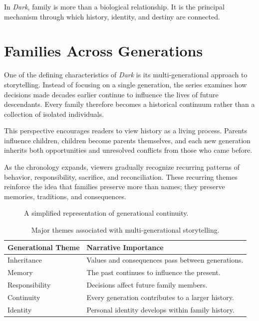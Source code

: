 \documentclass[12pt,oneside,openany]{book}
\begin{document}
\begin{tcolorbox}[colback=gray!8,colframe=black,title=Key Observation]
In \textit{Dark}, family is more than a biological relationship. It is the
principal mechanism through which history, identity, and destiny are connected.
\end{tcolorbox}
\section{Families Across Generations}

One of the defining characteristics of \textit{Dark} is its multi-generational
approach to storytelling. Instead of focusing on a single generation, the
series examines how decisions made decades earlier continue to influence the
lives of future descendants. Every family therefore becomes a historical
continuum rather than a collection of isolated individuals.

This perspective encourages readers to view history as a living process.
Parents influence children, children become parents themselves, and each new
generation inherits both opportunities and unresolved conflicts from those who
came before.

As the chronology expands, viewers gradually recognize recurring patterns of
behavior, responsibility, sacrifice, and reconciliation. These recurring
themes reinforce the idea that families preserve more than names; they preserve
memories, traditions, and consequences.

\begin{figure}[H]
\centering
{}
\caption{A simplified representation of generational continuity.}
\end{figure}

\begin{table}[H]
\centering
\begin{tabular}{|p{4cm}|p{8cm}|}
\hline
\textbf{Generational Theme} & \textbf{Narrative Importance}\\
\hline
Inheritance & Values and consequences pass between generations.\\
\hline
Memory & The past continues to influence the present.\\
\hline
Responsibility & Decisions affect future family members.\\
\hline
Continuity & Every generation contributes to a larger history.\\
\hline
Identity & Personal identity develops within family history.\\
\hline
\end{tabular}
\caption{Major themes associated with multi-generational storytelling.}
\end{table}
\end{document}
